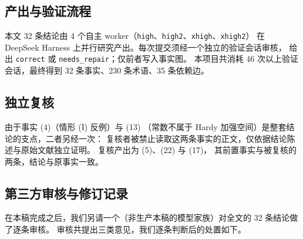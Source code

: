 \subsection{产出与验证流程}

本文 32 条结论由 4 个自主 worker（\texttt{high}、\texttt{high2}、\texttt{xhigh}、\texttt{xhigh2}）
在 DeepSeek Harness 上并行研究产出。每次提交须经一个独立的验证会话审核，
给出 \texttt{correct} 或 \texttt{needs\_repair}；仅前者写入事实图。
本项目共消耗 46 次以上验证会话，最终得到 32 条事实、230 条术语、35 条依赖边。

\subsection{独立复核}

由于事实 (4)（情形 (I) 反例）与 (13)
（常数不属于 Hardy 加强空间）是整套结论的支点，二者另经一次：
复核者被禁止读取这两条事实的正文，仅依据结论陈述与原始文献独立证明。
复核产出为 (5)、(22) 与 (17)，
其前置事实与被复核的两条，结论与原事实一致。

\subsection{第三方审核与修订记录}\label{sec:revision}

在本稿完成之后，我们另请一个（非生产本稿的模型家族）对全文的 32 条结论做了逐条审核。
审核共提出三类意见，我们逐条判断后的处置如下。

